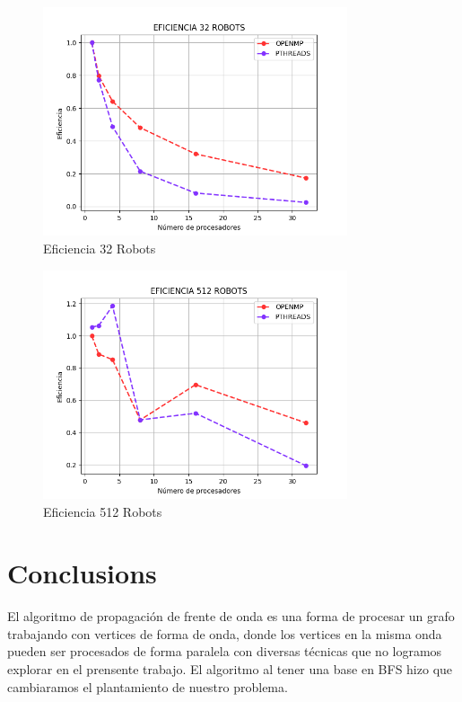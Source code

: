 \documentclass[oneside,twocolumn]{article}
\begin{document}
\begin{figure}[h]
    \centering
    \includegraphics[width=0.80\textwidth]{graficos/comparacion/eficiencia_32.png}
    \caption{Eficiencia 32 Robots}
    \label{fig:secuencial}
\end{figure}

\begin{figure}[h]
    \centering
    \includegraphics[width=0.80\textwidth]{graficos/comparacion/eficiencia_512.png}
    \caption{Eficiencia 512 Robots}
    \label{fig:secuencial}
\end{figure}


\newpage
\onecolumn
\section{Conclusions}

El algoritmo de propagación de frente de onda es una forma de procesar un grafo trabajando con vertices de forma de onda, donde los vertices en la misma onda pueden ser procesados de forma paralela con diversas técnicas que no logramos explorar en el prensente trabajo. El algoritmo al tener una base en BFS hizo que cambiaramos el plantamiento de nuestro problema.\\
\end{document}
